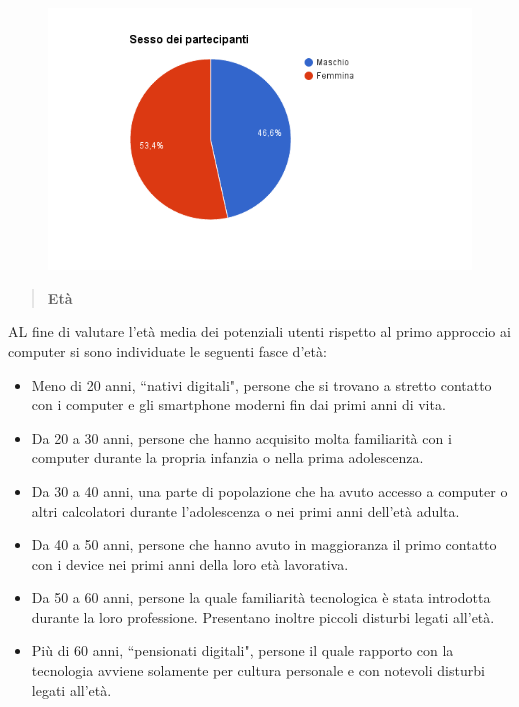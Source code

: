 \begin{figure}[H]
	\centering
	\includegraphics[scale=0.6]{img/chart_sesso}
\end{figure}

\begin{quote}
	\textbf{Età}
\end{quote}
AL fine di valutare l'età media dei potenziali utenti rispetto al primo approccio ai computer si sono individuate le seguenti fasce d'età:
\begin{itemize}
		\item Meno di 20 anni, ``nativi digitali", persone che si
			trovano a stretto contatto con i computer e gli
			smartphone moderni fin dai primi anni di vita.

		\item Da 20 a 30 anni, persone che hanno acquisito molta
			familiarità con i computer durante la propria infanzia o nella
			prima adolescenza.

		\item Da 30 a 40 anni, una parte di popolazione che ha avuto accesso
			a computer o altri calcolatori durante l'adolescenza o nei primi anni
			dell'età adulta.

		\item Da 40 a 50 anni, persone che hanno avuto in maggioranza il primo contatto con i device nei primi anni 
			della loro età lavorativa.

		\item Da 50 a 60 anni, persone la quale familiarità tecnologica è
			stata introdotta durante la loro professione.
			Presentano inoltre piccoli disturbi legati all'età.

		\item Più di 60 anni, ``pensionati digitali",  persone il quale rapporto con la
			tecnologia avviene solamente per cultura personale e con
			notevoli disturbi legati all'età.
\end{itemize}

